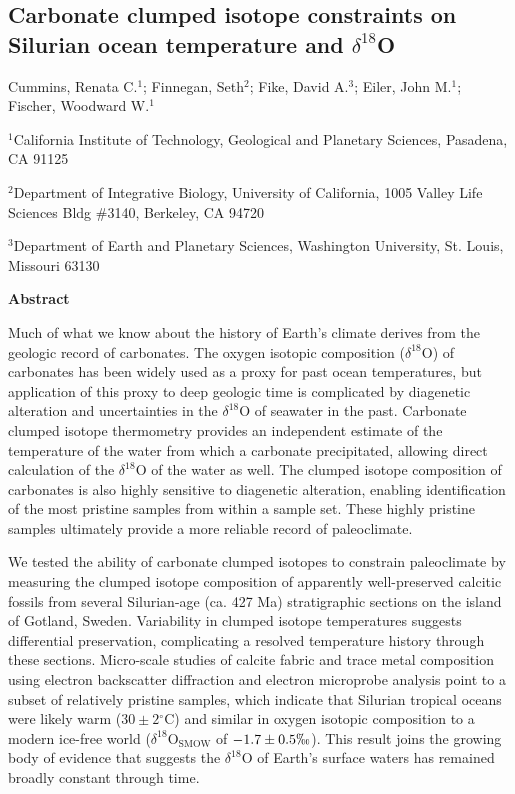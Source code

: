 \documentclass{article}
\newcommand{\deltao}{$\delta^{18}$}
\newcommand{\degrees}{$^{\circ}$}
\begin{document}
\subsection*{Carbonate clumped isotope constraints on Silurian ocean temperature and \deltao O}

\noindent Cummins, Renata C.$^1$; Finnegan, Seth$^2$; Fike, David A.$^3$; Eiler, John M.$^1$; Fischer, Woodward W.$^1$

\vspace{10pt}

\footnotesize

\noindent $^1$California Institute of Technology, Geological and Planetary Sciences, Pasadena, CA 91125

\noindent $^2$Department of Integrative Biology, University of California, 1005 Valley Life Sciences Bldg \#3140, Berkeley, CA 94720

\noindent $^3$Department of Earth and Planetary Sciences, Washington University, St. Louis, Missouri 63130

\normalsize

\linenumbers

\vspace{0.7cm} \noindent \large \textbf{Abstract} \normalsize

Much of what we know about the history of Earth's climate derives from the geologic record of carbonates. The oxygen isotopic composition (\deltao O) of carbonates has been widely used as a proxy for past ocean temperatures, but application of this proxy to deep geologic time is complicated by diagenetic alteration and uncertainties in the \deltao O of seawater in the past. Carbonate clumped isotope thermometry provides an independent estimate of the temperature of the water from which a carbonate precipitated, allowing direct calculation of the \deltao O of the water as well. The clumped isotope composition of carbonates is also highly sensitive to diagenetic alteration, enabling identification of the most pristine samples from within a sample set. These highly pristine samples ultimately provide a more reliable record of paleoclimate.

We tested the ability of carbonate clumped isotopes to constrain paleoclimate by measuring the clumped isotope composition of apparently well-preserved calcitic fossils from several Silurian-age (ca. 427 Ma) stratigraphic sections on the island of Gotland, Sweden. Variability in clumped isotope temperatures suggests differential preservation, complicating a resolved temperature history through these sections. Micro-scale studies of calcite fabric and trace metal composition using electron backscatter diffraction and electron microprobe analysis point to a subset of relatively pristine samples, which indicate that Silurian tropical oceans were likely warm ($30\pm 2$\degrees C) and similar in oxygen isotopic composition to a modern ice-free world (\deltao O$_{\text{SMOW}}$ of $-1.7\pm 0.5\permil$). This result joins the growing body of evidence that suggests the $\delta^{18}$O of Earth's surface waters has remained broadly constant through time. 
\end{document}
